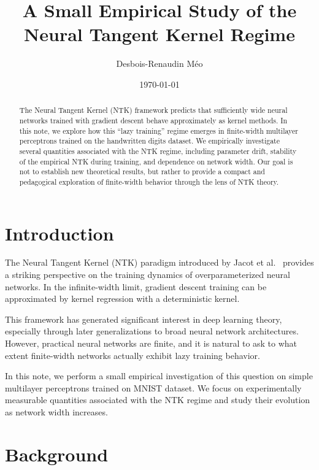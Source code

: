 \documentclass[11pt]{article}
\title{
A Small Empirical Study of the Neural Tangent Kernel Regime
}
\author{
Desbois-Renaudin Méo
}
\affil{
Independent Study
}
\date{\today}
\begin{document}
\maketitle

\begin{abstract}

The Neural Tangent Kernel (NTK) framework predicts that sufficiently wide neural networks trained with gradient descent behave approximately as kernel methods.
In this note, we explore how this ``lazy training'' regime emerges in finite-width multilayer perceptrons trained on the handwritten digits dataset.
We empirically investigate several quantities associated with the NTK regime, including parameter drift, stability of the empirical NTK during training, and dependence on network width.
Our goal is not to establish new theoretical results, but rather to provide a compact and pedagogical exploration of finite-width behavior through the lens of NTK theory.

\end{abstract}

\section{Introduction}

The Neural Tangent Kernel (NTK) paradigm introduced by Jacot et al.~\cite{jacot2018ntk} provides a striking perspective on the training dynamics of overparameterized neural networks.
In the infinite-width limit, gradient descent training can be approximated by kernel regression with a deterministic kernel.

This framework has generated significant interest in deep learning theory, especially through later generalizations to broad neural network architectures.
However, practical neural networks are finite, and it is natural to ask to what extent finite-width networks actually exhibit lazy training behavior.

In this note, we perform a small empirical investigation of this question on simple multilayer perceptrons trained on MNIST dataset.
We focus on experimentally measurable quantities associated with the NTK regime and study their evolution as network width increases.

\section{Background}
\end{document}
